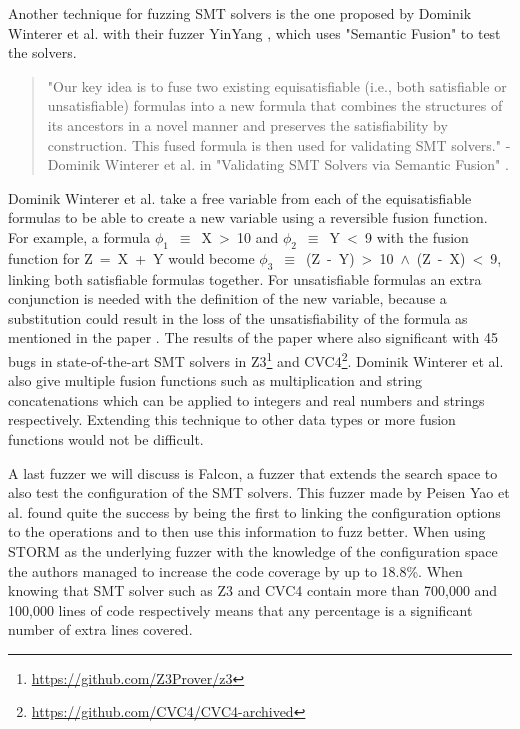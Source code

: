\label{fuzzing:SemanticFusion}
Another technique for fuzzing SMT solvers is the one proposed by Dominik Winterer et al. with their fuzzer YinYang \cite{43YinYang}, which uses "Semantic Fusion" to test the solvers.
\begin{quote}
	\label{quote:Fuzzing:YinYang}
	"Our key idea is to fuse two existing equisatisfiable (i.e., both satisfiable or unsatisfiable) formulas into a new formula that combines the structures of its ancestors in a novel manner and preserves the satisfiability by construction. This fused formula is then used for validating SMT solvers."
	\newline
	-Dominik Winterer et al. in "Validating SMT Solvers via Semantic Fusion" \cite{43YinYang}.
\end{quote}
Dominik Winterer et al. take a free variable from each of the equisatisfiable formulas to be able to create a new variable using a reversible fusion function. For example, a formula \mbox{$\phi_1$ $\equiv$ X > 10} and \mbox{$\phi_2$ $\equiv$ Y < 9} with the fusion function for \mbox{Z = X + Y} would become \mbox{$\phi_3$ $\equiv$ (Z - Y) > 10 $\land$ (Z - X) < 9}, linking both satisfiable formulas together. For unsatisfiable formulas an extra conjunction is needed with the definition of the new variable, because a substitution could result in the loss of the unsatisfiability of the formula as mentioned in the paper \cite{43YinYang}. The results of the paper where also significant with 45 bugs in state-of-the-art SMT solvers in Z3\footnote{\url{https://github.com/Z3Prover/z3}} and CVC4\footnote{\url{https://github.com/CVC4/CVC4-archived}}. Dominik Winterer et al. also give multiple fusion functions such as multiplication and string concatenations which can be applied to integers and real numbers and strings respectively. Extending this technique to other data types or more fusion functions would not be difficult.


A last fuzzer we will discuss is Falcon, a fuzzer that extends the search space to also test the configuration of the SMT solvers. This fuzzer made by Peisen Yao et al. \cite{42FalconFuzzingConfigurationSettingsAndNormal} found quite the success by being the first to linking the configuration options to the operations and to then use this information to fuzz better.
When using STORM as the underlying fuzzer with the knowledge of the configuration space the authors managed to increase the code coverage by up to 18.8\%. When knowing that SMT solver such as Z3 and CVC4 contain more than 700,000 and 100,000 lines of code respectively means that any percentage is a significant number of extra lines covered.

